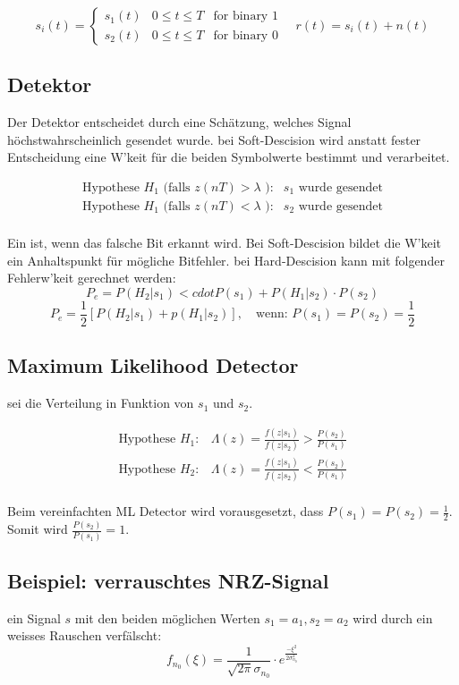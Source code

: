 \documentclass[a4paper]{article}
\begin{document}
\begin{twocolumn}
$$s_i(t) = \left\{ \begin{array}{lll} s_1(t) & 0 \leq t \leq T & \text{for binary 1} \\ 
s_2(t) & 0 \leq t \leq T & \text{for binary 0}\end{array} \right. \quad r(t) = s_i(t) + n(t)$$

\subsection{Detektor}
Der Detektor entscheidet durch eine Schätzung, welches Signal höchstwahrscheinlich gesendet wurde.
bei Soft-Descision wird anstatt fester Entscheidung eine W'keit für die beiden Symbolwerte bestimmt
und verarbeitet.

$$\begin{array}{ll}
  \text{Hypothese } H_1 \text{ (falls } z(nT) > \lambda \text{ ):} & s_1 \text{ wurde gesendet} \\
  \text{Hypothese } H_1 \text{ (falls } z(nT) < \lambda \text{ ):} & s_2 \text{ wurde gesendet} \\
\end{array}
$$

Ein  ist, wenn das falsche Bit erkannt wird. Bei Soft-Descision bildet die 
W'keit ein Anhaltspunkt für mögliche Bitfehler. bei Hard-Descision kann mit folgender 
Fehlerw'keit gerechnet werden:
$$P_e = P(H_2 | s_1) <cdot P(s_1) + P(H_1 | s_2) \cdot P(s_2)$$
$$P_e = \frac{1}{2} \left[ P(H_2 | s_1) + p(H_1 | s_2) \right], \quad \text{wenn: } P(s_1) = P(s_2) = \frac{1}{2} $$

\subsection{Maximum Likelihood Detector}

 sei die Verteilung in Funktion von $s_1$ und $s_2$. 

$$\begin{array}{ll}
\text{Hypothese } H_1: & \Lambda(z) = \frac{f(z|s_1)}{f(z|s_2)} > \frac{P(s_2)}{P(s_1)} \\
\text{Hypothese } H_2: & \Lambda(z) = \frac{f(z|s_1)}{f(z|s_2)} < \frac{P(s_2)}{P(s_1)} \\
\end{array}$$

Beim vereinfachten ML Detector wird vorausgesetzt, dass $P(s_1) = P(s_2) = \frac{1}{2}$. Somit wird
$\frac{P(s_2)}{P(s_1)} = 1$.

\subsection{Beispiel: verrauschtes NRZ-Signal}
ein Signal $s$ mit den beiden möglichen Werten $s_1 = a_1, s_2 = a_2$ wird durch ein weisses Rauschen 
verfälscht:
$$f_{n_0}(\xi) = \frac{1}{\sqrt{2\pi} \sigma_{n_0}} \cdot e^{\frac{-\xi^2}{2 \sigma_{n_0}^2}} $$


\end{twocolumn}
\end{document}
